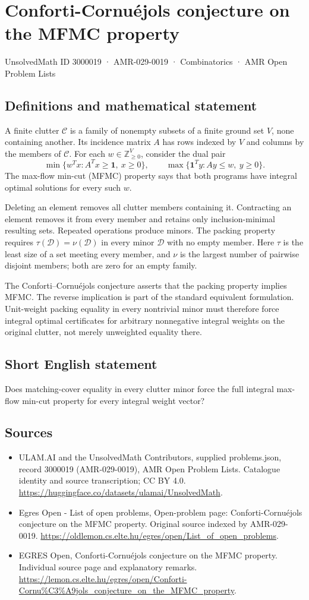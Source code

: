 \documentclass[11pt,a4paper]{article}
\begin{document}
\section*{Conforti-Cornuéjols conjecture on the MFMC property}\label{3000019}
{\small UnsolvedMath ID 3000019 · AMR-029-0019 · Combinatorics · AMR Open Problem Lists}
\subsection{Definitions and mathematical statement}
A finite clutter $\mathcal C$ is a family of nonempty subsets of a finite
ground set $V$, none containing another. Its incidence matrix $A$ has
rows indexed by $V$ and columns by the members of $\mathcal C$.
For each $w\in\mathbb Z_{\ge0}^V$, consider the dual pair
\[
 \min\{w^Tx:A^Tx\ge\mathbf1,\ x\ge0\},\qquad
 \max\{\mathbf1^Ty:Ay\le w,\ y\ge0\}.
\]
The max-flow min-cut (MFMC) property says that both programs have
integral optimal solutions for every such $w$.

Deleting an element removes all clutter members containing it.
Contracting an element removes it from every member and retains only
inclusion-minimal resulting sets. Repeated operations produce minors.
The packing property requires $\tau(\mathcal D)=\nu(\mathcal D)$ in every
minor $\mathcal D$ with no empty member. Here $\tau$ is the least size
of a set meeting every member, and $\nu$ is the largest number of
pairwise disjoint members; both are zero for an empty family.

The Conforti--Cornu\'{e}jols conjecture asserts that the packing property
implies MFMC. The reverse implication is part of the standard equivalent
formulation. Unit-weight packing equality in every nontrivial minor
must therefore force integral optimal certificates for arbitrary
nonnegative integral weights on the original clutter, not merely
unweighted equality there.
\subsection{Short English statement}
Does matching-cover equality in every clutter minor force the
full integral max-flow min-cut property for every integral weight vector?
\subsection{Sources}
\begin{itemize}
\item[S1] ULAM.AI and the UnsolvedMath Contributors, supplied problems.json, record 3000019 (AMR-029-0019), AMR Open Problem Lists. Catalogue identity and source transcription; CC BY 4.0.
\url{https://huggingface.co/datasets/ulamai/UnsolvedMath}.
\item[S2] Egres Open - List of open problems, Open-problem page: Conforti-Cornuéjols conjecture on the MFMC property. Original source indexed by AMR-029-0019.
\url{https://oldlemon.cs.elte.hu/egres/open/List_of_open_problems}.
\item[S3] EGRES Open, Conforti-Cornuéjols conjecture on the MFMC property. Individual source page and explanatory remarks.
\url{https://lemon.cs.elte.hu/egres/open/Conforti-Cornu%C3%A9jols_conjecture_on_the_MFMC_property}.
\end{itemize}
\end{document}
